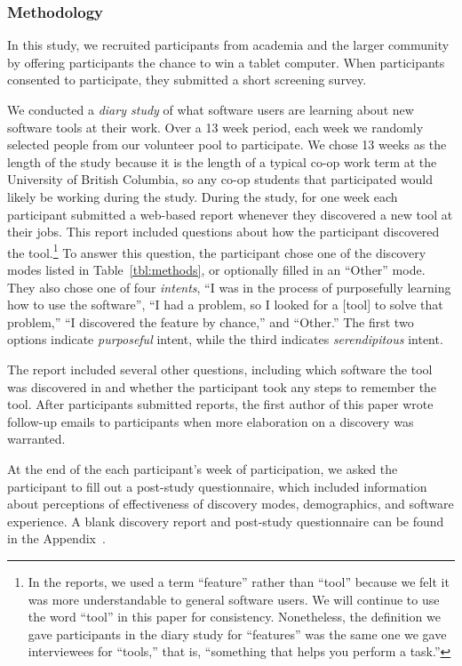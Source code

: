 \documentclass[smallextended]{svjour3}
\newcommand\context{mode\xspace}
\newcommand\contexts{modes\xspace}
\begin{document}
\subsubsection{Methodology}

\noindent
In this study, we recruited participants from academia and the larger community
by offering participants the chance to win a tablet computer.
When participants consented to participate, they submitted a short screening survey.

We conducted a \emph{diary study} of what software users 
are learning about new software tools at their work.
Over a 13 week period, each week we randomly selected people
from our volunteer pool to participate.
We chose 13 weeks as the length of the study because it is the 
length of a typical co-op work term at the University of British Columbia,
so any co-op students that participated would likely be working 
during the study.
During the study, for one week each participant submitted 
a web-based report whenever they discovered a new tool at their jobs.
This report included questions about how the participant discovered the 
tool.\footnote{In the reports, we used a term ``feature'' rather than ``tool''
because we felt it was more understandable to general software users.
We will continue to use the word ``tool'' in this paper for consistency.
Nonetheless, the definition we gave participants in the diary study for
``features'' was the same one we gave interviewees for ``tools,'' that is,
``something that helps you perform a task.''
}
To answer this question, the participant chose one of the discovery
\contexts listed in Table~\ref{tbl:methods}, or optionally filled in an
``Other'' \context.
They also chose one of four \emph{intents},
``I was in the process of purposefully learning how to use the software'',
``I had a problem, so I looked for a [tool] to solve that problem,''
``I discovered the feature by chance,'' and
``Other.''
The first two options indicate \emph{purposeful} intent, 
while the third indicates \emph{serendipitous} intent.
 
The report included several other questions, including which software the tool
was discovered in and whether the participant took any steps to remember the tool.
After participants submitted reports, the first author of this paper wrote follow-up
emails to participants when more elaboration on a discovery was warranted.

At the end of the each participant's week of participation, we asked the participant to 
fill out a post-study questionnaire, which included information about perceptions 
of effectiveness of discovery modes, demographics, and software experience.
A blank discovery report and post-study questionnaire can be found in the Appendix~\cite{appendix}.
 
\end{document}
